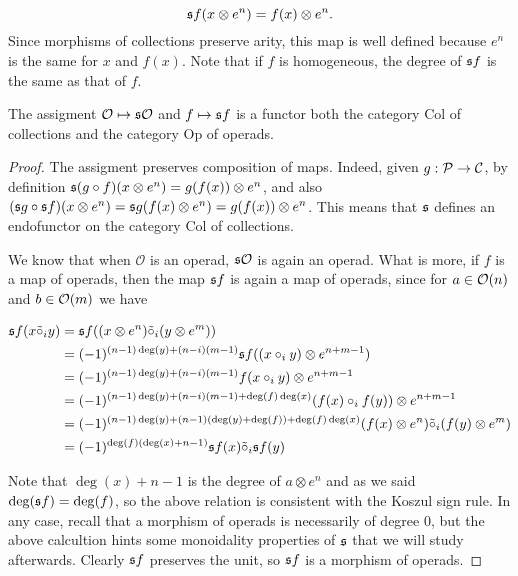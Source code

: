 \documentclass[join.tex]{subfiles}
\begin{document}
\begin{equation}\label{sf}
\mathfrak{s} f(x\otimes e^n)=f(x)\otimes e^n.
\end{equation}
Since morphisms of collections preserve arity, this map is well defined because $e^n$ is the same for $x$ and $f(x)$. Note that if $f$ is homogeneous, the degree of $\mathfrak{s} f$ is the same as that of $f$.

\begin{lem}
The assigment ${\mathcal O}\mapsto \mathfrak{s}{\mathcal O}$ and $f\mapsto \mathfrak{s} f$ is a functor both the category $\mathrm{Col}$ of collections and the category $\mathrm{Op}$ of operads.
\end{lem}

\begin{proof}
The assigment preserves composition of maps. Indeed, given $g:\mathcal{P}\to{\mathcal C}$, by definition $\mathfrak{s}(g\circ f)(x\otimes e^n)=g(f(x))\otimes e^n$, and also $(\mathfrak{s} g\circ \mathfrak{s} f)(x\otimes e^n)=\mathfrak{s} g (f(x)\otimes e^n)=g(f(x))\otimes e^n$. This means that $\mathfrak{s}$ defines an endofunctor on the category $\mathrm{Col}$ of collections.

We know that when $\mathcal{O}$ is an operad, $\mathfrak{s}{\mathcal O}$ is again  an operad. What is more, if $f$ is a map of operads, then the map $\mathfrak{s} f$ is again a map of operads, since for $a\in{\mathcal O}(n)$ and $b\in{\mathcal O}(m)$ we have

\begin{align*}
\mathfrak{s} f(x\tilde{\circ}_i y)&=\mathfrak{s} f ((x\otimes e^n)\tilde{\circ}_i (y\otimes e^m))\\
&=(-1)^{(n-1)\deg(y)+(n-i)(m-1)}\mathfrak{s} f((x\circ_i y) \otimes e^{n+m-1})\\
&=(-1)^{(n-1)\deg(y)+(n-i)(m-1)}f(x\circ_i y)\otimes e^{n+m-1}\\
&=(-1)^{(n-1)\deg(y)+(n-i)(m-1)+\deg(f)\deg(x)}(f(x)\circ_i f(y))\otimes e^{n+m-1}\\
&=(-1)^{(n-1)\deg(y)+(n-1)(\deg(y)+\deg(f))+\deg(f)\deg(x)}(f(x)\otimes e^n)\tilde{\circ}_i (f(y)\otimes e^m)\\
&=(-1)^{\deg(f)(\deg(x)+n-1)}\mathfrak{s} f(x)\tilde{\circ}_i\mathfrak{s} f(y)
\end{align*}

Note that $\deg(x)+n-1$ is the degree of $a\otimes e^n$ and as we said $\deg(\mathfrak{s} f)=\deg(f)$, so the above relation is consistent with the Koszul sign rule. In any case, recall that a morphism of operads is necessarily of degree 0, but the above calcultion hints some monoidality properties of $\mathfrak{s}$ that we will study afterwards. Clearly $\mathfrak{s} f$ preserves the unit, so $\mathfrak{s} f$ is a morphism of operads. 

\end{proof}
\end{document}
